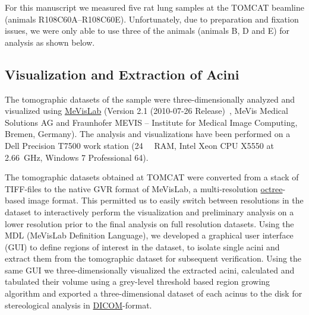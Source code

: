 \documentclass[twoside,paper=a4,abstract=true,english,DIVcalc]{scrartcl}
\begin{document}
For this manuscript we measured five rat lung samples at the TOMCAT beamline (animals R108C60A--R108C60E). Unfortunately, due to preparation and fixation issues, we were only able to use three of the animals (animals B, D and E) for analysis as shown below.

\subsection{Visualization and Extraction of Acini}
The tomographic datasets of the sample were three-dimensionally analyzed and visualized using \href{http://mevislab.de}{MeVisLab} (Version 2.1 (2010-07-26 Release)~\cite{Bitter2007}, MeVis Medical Solutions AG and Fraunhofer MEVIS -- Institute for Medical Image Computing, Bremen, Germany). The analysis and visualizations have been performed on a Dell Precision T7500 work station (\SI{24}{\giga\byte} RAM, Intel Xeon CPU X5550 at \SI{2.66}{\giga\hertz}, Windows 7 Professional \SI{64}{\bit}). 

The tomographic datasets obtained at TOMCAT were converted from a stack of TIFF-files to the native GVR format of MeVisLab, a multi-resolution \href{https://secure.wikimedia.org/wikipedia/en/w/index.php?title=Octree&oldid=409131920}{octree}-based image format. This permitted us to easily switch between resolutions in the dataset to interactively perform the visualization and preliminary analysis on a lower resolution prior to the final analysis on full resolution datasets. Using the MDL (MeVisLab Definition Language), we developed a graphical user interface (GUI) to define regions of interest in the dataset, to isolate single acini and extract them from the tomographic dataset for subsequent verification. Using the same GUI we three-dimensionally visualized the extracted acini, calculated and tabulated their volume using a grey-level threshold based region growing algorithm and exported a three-dimensional dataset of each acinus to the disk for stereological analysis in \href{http://en.wikipedia.org/w/index.php?title=DICOM&oldid=511155074}{DICOM}-format.
\end{document}
